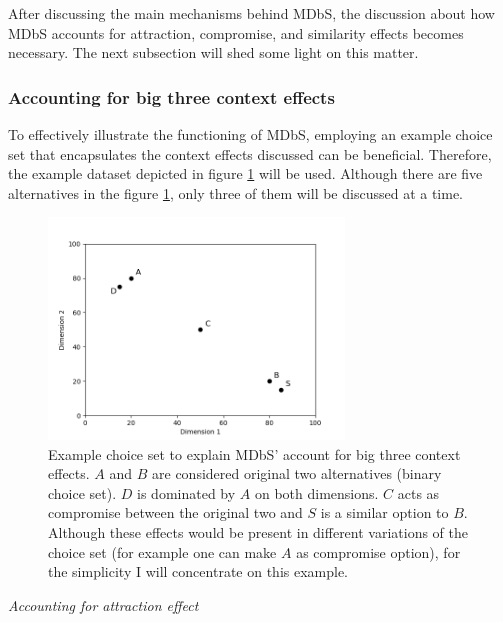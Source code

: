 \documentclass[a4paper,12pt]{article}
\begin{document}
After discussing the main mechanisms behind MDbS, the discussion about how MDbS accounts for attraction, compromise, and similarity effects becomes necessary. The next subsection will shed some light on this matter.

\subsubsection{Accounting for big three context effects}

To effectively illustrate the functioning of MDbS, employing an example choice set that encapsulates the context effects discussed can be beneficial. Therefore, the example dataset depicted in figure \ref{fig:MDBsContextExample} will be used. Although there are five alternatives in the figure \ref{fig:MDBsContextExample}, only three of them will be discussed at a time.

\begin{figure}[h]
    \centering
    \includegraphics[width=0.7\textwidth]{staticFiles/contextEffectExampleScatterplot.png}
    \caption[MDbS’ account for big three context effects]{Example choice set to explain MDbS' account for big three context effects. $A$ and $B$ are considered original two alternatives (binary choice set). $D$ is dominated by $A$ on both dimensions. $C$ acts as compromise between the original two and $S$ is a similar option to $B$. Although these effects would be present in different variations of the choice set (for example one can make $A$ as compromise option), for the simplicity I will concentrate on this example.} %
    \label{fig:MDBsContextExample} %

\end{figure}

\textit{Accounting for attraction effect}
\end{document}
